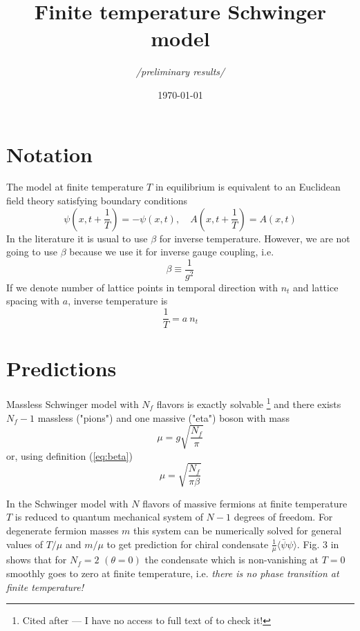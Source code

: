 \documentclass[12pt,a4paper]{article}
\title{Finite temperature Schwinger model}
\author{\em{/preliminary results/}}
\date{\today}
\begin{document}
\maketitle

\section{Notation}

The model at finite temperature $T$ in equilibrium is equivalent to an Euclidean field theory satisfying boundary conditions \cite{Hosotani:1995gn}
\begin{equation}
  \psi(x, t + \frac{1}{T}) = -\psi(x, t), \quad A(x, t + \frac{1}{T}) = A(x, t)
\end{equation}
In the literature it is usual to use $\beta$ for inverse temperature. However, we are not going to use $\beta$ because we use it for inverse gauge coupling, i.e.
\begin{equation}
  \beta \equiv \frac{1}{g^2}  \label{eq:beta}
\end{equation}
If we denote number of lattice points in temporal direction with $n_t$ and lattice spacing with $a$, inverse temperature is
\begin{equation}
  \frac{1}{T} = a\: n_t  \label{eq:inv-temp}
\end{equation}


\section{Predictions}

Massless Schwinger model with $N_f$ flavors is exactly solvable \cite{Affleck:1985wa}\footnote{Cited after \cite{Hetrick:1995wq} --- I have no access to full text of \cite{Affleck:1985wa} to check it!} and there exists $N_f - 1$ massless ("pions") and one massive ("eta") boson with mass
\begin{equation}
  \mu = g \sqrt{\frac{N_f}{\pi}}
\end{equation}
or, using definition (\ref{eq:beta})
\begin{equation}
  \mu = \sqrt{\frac{N_f}{\pi \beta}}  \label{eq:mu-beta}
\end{equation}

In \cite{Hetrick:1995yx} the Schwinger model with $N$ flavors of massive fermions at finite temperature $T$ is reduced to quantum mechanical system of $N - 1$ degrees of freedom. For degenerate fermion masses $m$ this system can be numerically solved for general values of $T/\mu$ and $m/\mu$ to get prediction for chiral condensate $\frac{1}{\mu}\langle\bar{\psi}\psi\rangle$. Fig. 3 in \cite{Hetrick:1995yx} shows that for $N_f = 2$ $(\theta = 0)$ the condensate which is non-vanishing at $T = 0$ smoothly goes to zero at finite temperature, i.e. {\em there is no phase transition at finite temperature!}
\end{document}
